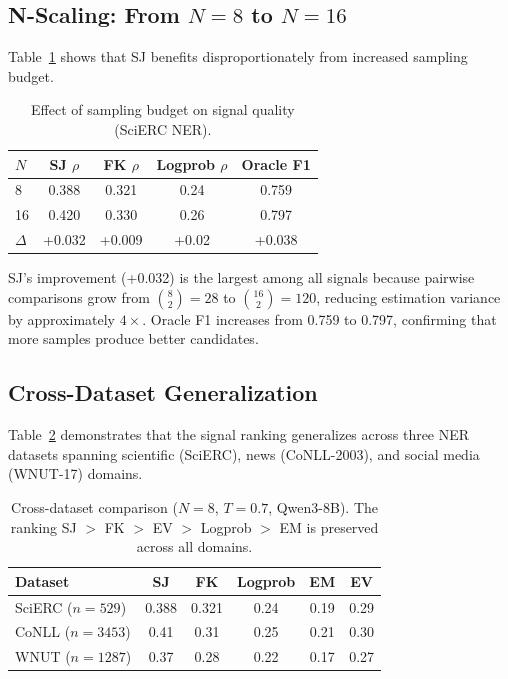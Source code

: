 \documentclass[11pt,a4paper]{article}
\begin{document}
\subsection{N-Scaling: From $N{=}8$ to $N{=}16$}
\label{sec:nscaling}

Table~\ref{tab:nscaling} shows that SJ benefits disproportionately from increased sampling budget.

\begin{table}[t]
\centering
\small
\caption{Effect of sampling budget on signal quality (SciERC NER).}
\label{tab:nscaling}
\begin{tabular}{lcccc}
\toprule
\textbf{$N$} & \textbf{SJ $\rho$} & \textbf{FK $\rho$} & \textbf{Logprob $\rho$} & \textbf{Oracle F1} \\
\midrule
8  & 0.388 & 0.321 & 0.24 & 0.759 \\
16 & 0.420 & 0.330 & 0.26 & 0.797 \\
\midrule
$\Delta$ & +0.032 & +0.009 & +0.02 & +0.038 \\
\bottomrule
\end{tabular}
\end{table}

SJ's improvement (+0.032) is the largest among all signals because pairwise comparisons grow from $\binom{8}{2}{=}28$ to $\binom{16}{2}{=}120$, reducing estimation variance by approximately $4\times$. Oracle F1 increases from 0.759 to 0.797, confirming that more samples produce better candidates.

\subsection{Cross-Dataset Generalization}
\label{sec:crossdataset}

Table~\ref{tab:crossdataset} demonstrates that the signal ranking generalizes across three NER datasets spanning scientific (SciERC), news (CoNLL-2003), and social media (WNUT-17) domains.

\begin{table}[t]
\centering
\small
\caption{Cross-dataset comparison ($N{=}8$, $T{=}0.7$, Qwen3-8B). The ranking SJ $>$ FK $>$ EV $>$ Logprob $>$ EM is preserved across all domains.}
\label{tab:crossdataset}
\begin{tabular}{lccccc}
\toprule
\textbf{Dataset} & \textbf{SJ} & \textbf{FK} & \textbf{Logprob} & \textbf{EM} & \textbf{EV} \\
\midrule
SciERC ($n{=}529$) & 0.388 & 0.321 & 0.24 & 0.19 & 0.29 \\
CoNLL ($n{=}3453$) & 0.41 & 0.31 & 0.25 & 0.21 & 0.30 \\
WNUT ($n{=}1287$) & 0.37 & 0.28 & 0.22 & 0.17 & 0.27 \\
\bottomrule
\end{tabular}
\end{table}
\end{document}
